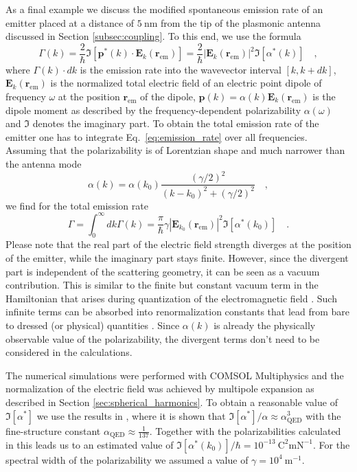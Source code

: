 \documentclass[10pt,letterpaper]{article}
\renewcommand{\vec}[1]{\mathbf{#1}}
\begin{document}
As a final example we discuss the modified spontaneous emission rate of an emitter placed at a distance of $5~\text{nm}$ from the tip of the plasmonic antenna discussed in Section \ref{subsec:coupling}. To this end, we use the formula \cite{Sauvan2013}
\begin{equation}
\Gamma(k) = \frac{2}{\hbar}\Im\left[\vec{p}^*(k)\cdot\vec{E}_k(\vec{r}_{\text{em}})\right] = \frac{2}{\hbar}|\vec{E}_k(\vec{r}_{\text{em}})|^2\Im[\alpha^*(k)] \quad , \label{eq:emission_rate}
\end{equation}
where $\Gamma(k) \cdot dk$ is the emission rate into the wavevector interval $[k, k+dk]$, $\vec{E}_k(\vec{r}_{\text{em}})$ is the normalized total electric field of an electric point dipole of frequency $\omega$ at the position $\vec{r}_{\text{em}}$ of the dipole, $\vec{p}(k)=\alpha(k)\vec{E}_k(\vec{r}_{\text{em}})$ is the dipole moment as described by the frequency-dependent polarizability $\alpha(\omega)$ and $\Im$ denotes the imaginary part. To obtain the total emission rate of the emitter one has to integrate Eq.~\eqref{eq:emission_rate} over all frequencies. Assuming that the polarizability is of Lorentzian shape and much narrower than the antenna mode
\begin{equation}
\alpha(k) = \alpha(k_0)\frac{(\gamma/2)^2}{(k-k_0)^2+(\gamma/2)^2} \quad ,
\end{equation}
 we find for the total emission rate
\begin{equation}
\Gamma = \int_0^\infty dk\Gamma(k) = \frac{\pi}{\hbar}\gamma|\vec{E}_{k_0}(\vec{r}_{\text{em}})|^2\Im[\alpha^*(k_0)] \quad .
\end{equation}
Please note that the real part of the electric field strength diverges at the position of the emitter, while the imaginary part stays finite. However, since the divergent part is independent of the scattering geometry, it can be seen as a vacuum contribution. This is similar to the finite but constant vacuum term in the Hamiltonian that arises during quantization of the electromagnetic field \cite{Vogel1994}. Such infinite terms can be absorbed into renormalization constants that lead from bare to dressed (or physical) quantities \cite{Ryder1996}. Since $\alpha(k)$ is already the physically observable value of the polarizability, the divergent terms don't need to be considered in the calculations.

The numerical simulations were performed with COMSOL Multiphysics and the normalization of the electric field was achieved by multipole expansion as described in Section \ref{sec:spherical_harmonics}. To obtain a reasonable value of $\Im[\alpha^*]$ we use the results in \cite{Jentschura2015}, where it is shown that $\Im[\alpha^*]/\alpha \approx \alpha_{\text{QED}}^3$ with the fine-structure constant $\alpha_{\text{QED}}\approx\frac{1}{137}$. Together with the polarizabilities calculated in \cite{Goldman1989} this leads us to an estimated value of $\Im[\alpha^*(k_0)]/\hbar = 10^{-13}~\text{C}^2\text{m}\text{N}^{-1}$. For the spectral width of the polarizability we assumed a value of $\gamma = 10^4~\text{m}^{-1}$.
\end{document}
